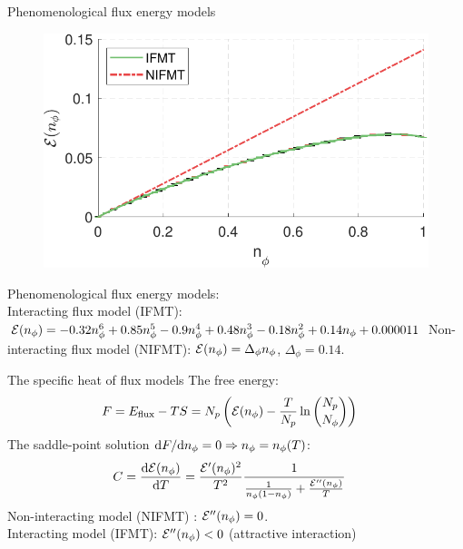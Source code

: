 \begin{frame}{Phenomenological flux energy models}
    \begin{figure}
        \centering
        \begin{minipage}[c]{.7\textwidth}
            \includegraphics[width = 1\textwidth]{figures/limit_poly_linear.pdf}
        \end{minipage}
    \end{figure}

    Phenomenological flux energy models:\\
    Interacting flux model (IFMT): $\mathcal{E}(n_\phi) = -0.32n_\phi^6 + 0.85n_\phi^5 - 0.9n_\phi^4 + 0.48n_\phi^3 - 0.18n_\phi^2 + 0.14n_\phi + 0.000011$
    Non-interacting flux model (NIFMT):  $\mathcal{E}(n_\phi) = \Delta_\phi n_\phi$, $\Delta_\phi = 0.14$.\\
\end{frame}



\begin{frame}{The specific heat of flux models}
The free energy:
\begin{align*}
    F &= E_{\textmd{flux}} - TS = N_p\left(\mathcal{E}(n_\phi) - \frac{T}{N_p}\ln{{N_p \choose N_\phi}}\right)
\end{align*}
The saddle-point solution $\mathrm{d} F/\mathrm{d} n_\phi = 0 \Rightarrow n_\phi = n_\phi(T)$:
\begin{align*}
    C &= \frac{\mathrm{d} \mathcal{E}(n_\phi)}{\mathrm{d} T} = \frac{\mathcal{E}'(n_\phi)^2}{T^2}\frac{1}{\frac{1}{n_\phi(1-n_\phi)} + \frac{\mathcal{E}''(n_\phi)}{T}}
\end{align*} 
Non-interacting model (NIFMT) : $\mathcal{E}''(n_\phi) = 0$.\\
Interacting model (IFMT): $\mathcal{E}''(n_\phi) < 0$ (attractive interaction) \\


\end{frame}


